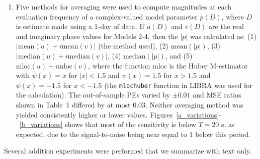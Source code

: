 \documentclass[draft,linenumbers]{agujournal2018}
\begin{document}
\begin{enumerate}
\item Five methods for averaging were used to compute magnitudes at each evaluation frequency of a complex-valued model parameter $p(D)$, where $D$ is estimate made using a 1-day of data. If $u(D)$ and $v(D)$ are the real and imaginary phase values for Models 2-4, then the $|p|$ was calculated as: (1) $|\text{mean}(u)+i\text{mean}(v)|$ (the method used), (2) $\text{mean}(|p|)$, (3) $|\text{median}(u)+i\text{median}(v)|$, (4) $\text{median}(|p|)$, and (5) $\text{mloc}(u) + i\text{mloc}(v)$, where the function $\text{mloc}$ is the Huber M-estimator \citep{Huber2011} with $\psi(x)=x$ for $|x|<1.5$ and $\psi(x) = 1.5$ for $x>1.5$ and $\psi(x) = -1.5$ for $x<-1.5$ (the \texttt{mlochuber} function in LIBRA \citep{Verboven2010} was used for the calculation). The out-of-sample PEs varied by $\pm 0.01$ and MSE ratios shown in Table~1 differed by at most $0.03$. Neither averaging method was yielded consistently higher or lower values. Figures~\ref{a_variations}-~\ref{b_variations} shows that most of the sensitivity is below $T=20$ s, as expected, due to the signal-to-noise being near equal to 1 below this period.

\end{enumerate}

Several addition experiments were performed that we summarize with text only.
\end{document}
